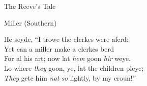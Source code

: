 \begin{texts}{The Reeve's Tale}
\begin{textglossed}
Miller (Southern)

He seyde, ``I trowe the clerkes were aferd;\\
Yet can a miller make a clerkes berd \\
For al his art; now lat \emph{hem} goon \emph{hir} weye.\\ 
Lo where \emph{they} goon, ye, lat the children pleye;\\
\emph{They} gete him \emph{nat} \emph{so} lightly, by my croun!''
\end{textglossed}


\end{texts}


